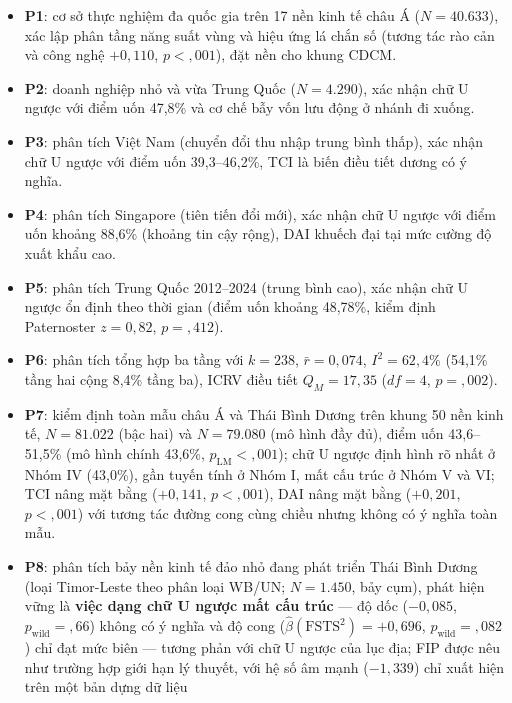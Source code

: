 \documentclass[
  a4paper,
  13pt]{extreport}
\begin{document}
\begin{itemize}
\item
  \textbf{P1}: cơ sở thực nghiệm đa quốc gia trên 17 nền kinh tế châu Á
  (\(N = 40.633\)), xác lập phân tầng năng suất vùng và hiệu ứng lá chắn
  số (tương tác rào cản và công nghệ \(+0{,}110\), \(p < {,}001\)), đặt
  nền cho khung CDCM.
\item
  \textbf{P2}: doanh nghiệp nhỏ và vừa Trung Quốc (\(N = 4.290\)), xác
  nhận chữ U ngược với điểm uốn 47,8\% và cơ chế bẫy vốn lưu động ở
  nhánh đi xuống.
\item
  \textbf{P3}: phân tích Việt Nam (chuyển đổi thu nhập trung bình thấp),
  xác nhận chữ U ngược với điểm uốn 39,3--46,2\%, TCI là biến điều tiết
  dương có ý nghĩa.
\item
  \textbf{P4}: phân tích Singapore (tiên tiến đổi mới), xác nhận chữ U
  ngược với điểm uốn khoảng 88,6\% (khoảng tin cậy rộng), DAI khuếch đại
  tại mức cường độ xuất khẩu cao.
\item
  \textbf{P5}: phân tích Trung Quốc 2012--2024 (trung bình cao), xác
  nhận chữ U ngược ổn định theo thời gian (điểm uốn khoảng 48,78\%, kiểm
  định Paternoster \(z = 0{,}82\), \(p = {,}412\)).
\item
  \textbf{P6}: phân tích tổng hợp ba tầng với \(k = 238\),
  \(\bar{r} = 0{,}074\), \(I^2 = 62{,}4\%\) (54,1\% tầng hai cộng 8,4\%
  tầng ba), ICRV điều tiết \(Q_M = 17{,}35\) (\(df = 4\),
  \(p = {,}002\)).
\item
  \textbf{P7}: kiểm định toàn mẫu châu Á và Thái Bình Dương trên khung
  50 nền kinh tế, \(N = 81.022\) (bậc hai) và \(N = 79.080\) (mô hình
  đầy đủ), điểm uốn 43,6--51,5\% (mô hình chính 43,6\%,
  \(p_\text{LM} < {,}001\)); chữ U ngược định hình rõ nhất ở Nhóm IV
  (43,0\%), gần tuyến tính ở Nhóm I, mất cấu trúc ở Nhóm V và VI; TCI
  nâng mặt bằng (\(+0{,}141\), \(p<{,}001\)), DAI nâng mặt bằng
  (\(+0{,}201\), \(p<{,}001\)) với tương tác đường cong cùng chiều nhưng
  không có ý nghĩa toàn mẫu.
\item
  \textbf{P8}: phân tích bảy nền kinh tế đảo nhỏ đang phát triển Thái
  Bình Dương (loại Timor-Leste theo phân loại WB/UN; \(N = 1.450\), bảy
  cụm), phát hiện vững là \textbf{việc dạng chữ U ngược mất cấu trúc}
  --- độ dốc (\(-0{,}085\), \(p_\text{wild} = {,}66\)) không có ý nghĩa
  và độ cong (\(\hat{\beta}(\text{FSTS}^2) = +0{,}696\),
  \(p_\text{wild} = {,}082\)) chỉ đạt mức biên --- tương phản với chữ U
  ngược của lục địa; FIP được nêu như trường hợp giới hạn lý thuyết, với
  hệ số âm mạnh (\(-1{,}339\)) chỉ xuất hiện trên một bản dựng dữ liệu

\end{itemize}
\end{document}
